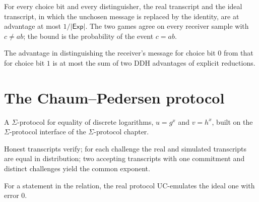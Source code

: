 \begin{theorem}
  \label{thm:ot-sender-game}
  \leanok
  For every choice bit and every distinguisher, the real transcript and the ideal
  transcript, in which the unchosen message is replaced by the identity, are at
  advantage at most $1/|\mathsf{Exp}|$. The two games agree on every receiver
  sample with $c \neq ab$; the bound is the probability of the event $c = ab$.
\end{theorem}

\begin{theorem}
  \label{thm:ot-receiver}
  \leanok
  The advantage in distinguishing the receiver's message for choice bit $0$ from
  that for choice bit $1$ is at most the sum of two DDH advantages of explicit
  reductions.
\end{theorem}

\section{The Chaum--Pedersen protocol}

A $\Sigma$-protocol for equality of discrete logarithms, $u = g^x$ and $v = h^x$,
built on the $\Sigma$-protocol interface of the $\Sigma$-protocol chapter.

\begin{theorem}
  \label{thm:chaum-pedersen}
  \leanok
  Honest transcripts verify; for each challenge the real and simulated
  transcripts are equal in distribution; two accepting transcripts with one
  commitment and distinct challenges yield the common exponent.
\end{theorem}

\begin{theorem}[UC security]
  \label{thm:chaum-pedersen-uc}
  \leanok
  For a statement in the relation, the real protocol UC-emulates the ideal one
  with error $0$.
\end{theorem}

